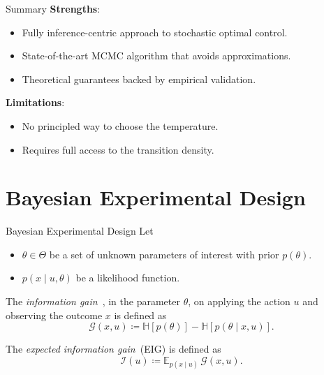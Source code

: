 \documentclass[10pt, aspectratio=1610]{beamer}
\begin{document}
    \begin{frame}{Summary}
      \textbf{Strengths}:\vspace{1em}
      \begin{itemize}
        \setlength\itemsep{1em}
        \item Fully inference-centric approach to stochastic optimal control.
        \item State-of-the-art MCMC algorithm that avoids approximations.
        \item Theoretical guarantees backed by empirical validation.
      \end{itemize}
      \vspace{1em}
      \textbf{Limitations}:\vspace{1em}
      \begin{itemize}
        \setlength\itemsep{1em}
        \item No principled way to choose the temperature.
        \item Requires full access to the transition density.
      \end{itemize}
    \end{frame}

    \section{Bayesian Experimental Design}
    \begin{frame}{Bayesian Experimental Design}
      Let
      \begin{itemize}
        \item $\theta \in \Theta$ be a set of unknown parameters of interest with prior $p(\theta)$.
        \item $p(x \mid u, \theta)$ be a likelihood function.
      \end{itemize}
      
      \pause
      \begin{definition}
        The \emph{information gain}~\citep[IG,][]{lindley1956measure}, in the parameter $\theta$, on applying the action $u$ and observing the outcome $x$ is defined as
        \begin{equation}\label{eq:ig_single_experiment}
          \mathcal{G}(x, u) \coloneq \mathbb{H}[p(\theta)] - \mathbb{H}[p(\theta\mid x, u)].
        \end{equation}
      \end{definition}

      \pause
      \begin{definition}
        The \emph{expected information gain}~(EIG) is defined as
        \begin{equation}
          \mathcal{I}(u) \coloneq \mathbb{E}_{p(x \mid u)} \, \mathcal{G}(x, u).
        \end{equation}
      \end{definition}
    \end{frame}
\end{document}
